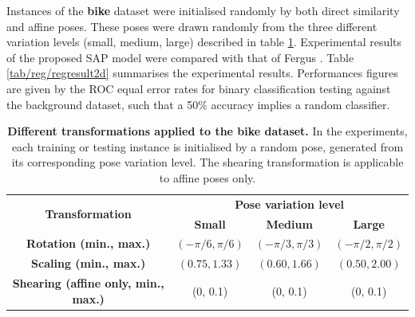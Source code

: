 Instances of the \textbf{bike} dataset were initialised randomly by both direct similarity and affine poses. 
These poses were drawn randomly from the three different variation levels (small, medium, large) described in table \ref{tab/reg/posevariation}.
Experimental results of the proposed SAP model were compared with that of Fergus \etal \cite{Fergus2007}.   
Table \ref{tab/reg/regresult2d} summarises the experimental results. 
Performances figures are given by the ROC equal error rates for binary classification testing against the background dataset, such that a 50\% accuracy implies a random classifier. 

\begin{table}
	\centering
	\begin{tabular}{|c|c|c|c|}
		\hline
		\multirow{2}{*}{\textbf{Transformation}} & \multicolumn{3}{c|}{\textbf{Pose variation level}} \\
		\cline{2-4}
		& \textbf{Small} & \textbf{Medium} & \textbf{Large} \\
		\hline
		\textbf{Rotation (min., max.)} & $(-\pi/6, \pi/6)$ & $(-\pi/3, \pi/3)$ & $(-\pi/2, \pi/2)$ \\
		\hline 
		\textbf{Scaling (min., max.)} & $(0.75, 1.33)$ & $(0.60, 1.66)$ & $(0.50, 2.00)$ \\
		\hline 
		\textbf{Shearing (affine only, min., max.)} & (0, 0.1) & (0, 0.1) & (0, 0.1) \\
		\hline
	\end{tabular}
	\caption{\textbf{Different transformations applied to the bike dataset.} In the experiments, each training or testing instance is initialised by a random pose, generated from its corresponding pose variation level. The shearing transformation is applicable to affine poses only.}
	\label{tab/reg/posevariation}
\end{table}

